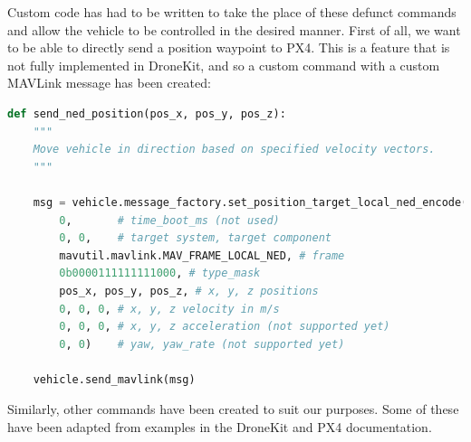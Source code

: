 \documentclass[10pt]{article}
\begin{document}
Custom code has had to be written to take the place of these defunct commands and allow the vehicle to be controlled in the desired manner. First of all, we want to be able to directly send a position waypoint to PX4. This is a feature that is not fully implemented in DroneKit, and so a custom command with a custom MAVLink message has been created:
\begin{lstlisting}[language=Python]
def send_ned_position(pos_x, pos_y, pos_z):
    """
    Move vehicle in direction based on specified velocity vectors.
    """

    msg = vehicle.message_factory.set_position_target_local_ned_encode(
        0,       # time_boot_ms (not used)
        0, 0,    # target system, target component
        mavutil.mavlink.MAV_FRAME_LOCAL_NED, # frame
        0b0000111111111000, # type_mask
        pos_x, pos_y, pos_z, # x, y, z positions
        0, 0, 0, # x, y, z velocity in m/s
        0, 0, 0, # x, y, z acceleration (not supported yet)
        0, 0)    # yaw, yaw_rate (not supported yet)

    vehicle.send_mavlink(msg)
\end{lstlisting}

Similarly, other commands have been created to suit our purposes. Some of these have been adapted from examples in the DroneKit and PX4 documentation.\cite{dronekit}\cite{PX4_dev_guide}
\end{document}
